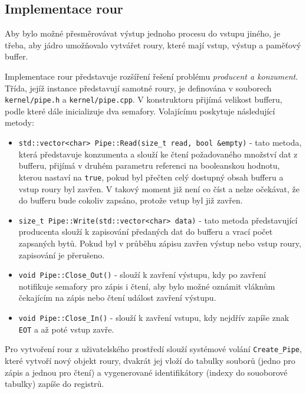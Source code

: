 \documentclass[12pt, a4paper]{article}
\begin{document}
\subsection{Implementace rour}
Aby bylo možné přesměrovávat výstup jednoho procesu do vstupu jiného, je třeba, aby jádro umožňovalo vytvářet roury, které mají vstup, výstup a paměťový buffer.

Implementace rour představuje rozšíření řešení problému \textit{producent a konzument}. Třída, jejíž instance představují samotné roury, je definována v souborech \texttt{kernel/pipe.h} a \texttt{kernel/pipe.cpp}. V konstruktoru přijímá velikost bufferu, podle které dále inicializuje dva semafory. Volajícímu poskytuje následující metody:

\begin{itemize}

    \item \texttt{std::vector<char> Pipe::Read(size\_t read, bool \&empty)} - tato metoda, která představuje konzumenta a slouží ke čtení požadovaného množství dat z bufferu, přijímá v druhém parametru referenci na booleanskou hodnotu, kterou nastaví na \texttt{true}, pokud byl přečten celý dostupný obsah bufferu a vstup roury byl zavřen. V takový moment již není co číst a nelze očekávat, že do bufferu bude cokoliv zapsáno, protože vstup byl již zavřen.

    \item \texttt{size\_t Pipe::Write(std::vector<char> data)} - tato metoda představující producenta slouží k zapisování předaných dat do bufferu a vrací počet zapsaných bytů. Pokud byl v průběhu zápisu zavřen výstup nebo vstup roury, zapisování je přerušeno.

    \item \texttt{void Pipe::Close\_Out()} - slouží k zavření výstupu, kdy po zavření notifikuje semafory pro zápis i čtení, aby bylo možné oznámit vláknům čekajícím na zápis nebo čtení událost zavření výstupu.

    \item \texttt{void Pipe::Close\_In()} - slouží k zavření vstupu, kdy nejdřív zapíše znak \texttt{EOT} a až poté vstup zavře. 

\end{itemize}

Pro vytvoření rour z uživatelského prostředí slouží systémové volání \texttt{Create\_Pipe}, které vytvoří nový objekt roury, dvakrát jej vloží do tabulky souborů (jedno pro zápis a jednou pro čtení) a vygenerované identifikátory (indexy do souoborové tabulky) zapíše do registrů.
\end{document}
